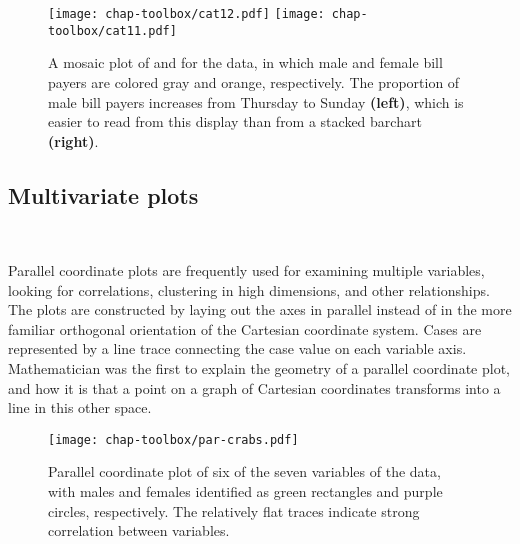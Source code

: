 \begin{figure}[htp]
\texttt{[image: chap-toolbox/cat12.pdf]}
\texttt{[image: chap-toolbox/cat11.pdf]}
\caption[A mosaic plot of  and  for the 
data]{A mosaic plot of  and  for the 
data, in which male and female bill payers are colored gray and
orange, respectively.  The proportion of male bill payers increases
from Thursday to Sunday {\bf (left)}, which is easier to read from
this display than from a stacked barchart {\bf (right)}.  }
\label{mosaic}
\end{figure}

\newpage
\subsection{Multivariate plots}~\label{pD}


\bigskip

Parallel coordinate plots \cite{In85,We90} are frequently used for
examining multiple variables, looking for correlations, clustering in
high dimensions, and other relationships.  The plots are constructed
by laying out the axes in parallel instead of in the more familiar
orthogonal orientation of the Cartesian coordinate system. Cases are
represented by a line trace connecting the case value on each variable
axis.  Mathematician  was the first to explain the
geometry of a parallel coordinate plot, and how it is that a point on
a graph of Cartesian coordinates transforms into a line in this other
space.

\begin{figure}[h]
\centerline{\texttt{[image: chap-toolbox/par-crabs.pdf]}}
\caption[Parallel coordinate plot of the 
data]{Parallel coordinate plot of six of the seven variables of the
 data, with males and females identified as
green rectangles and purple circles, respectively.  The relatively flat
traces indicate strong correlation between variables.}
\label{parallel}
\end{figure}


